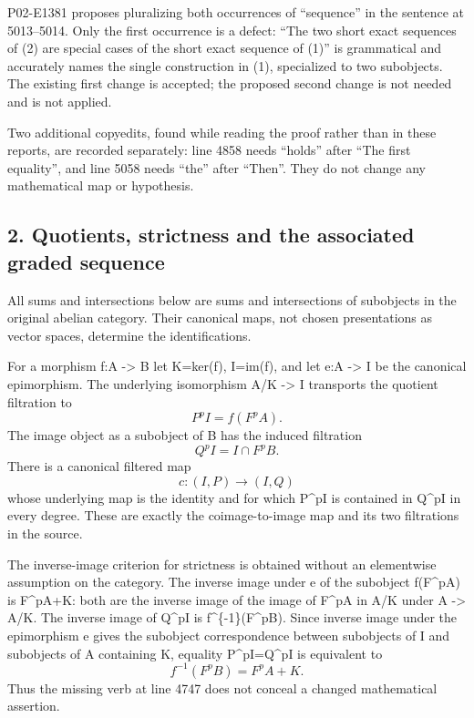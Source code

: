 P02-E1381 proposes pluralizing both occurrences of ``sequence'' in the sentence at 5013--5014. Only the first occurrence is a defect: ``The two short exact sequences of (2) are special cases of the short exact sequence of (1)'' is grammatical and accurately names the single construction in (1), specialized to two subobjects. The existing first change is accepted; the proposed second change is not needed and is not applied.

Two additional copyedits, found while reading the proof rather than in these reports, are recorded separately: line 4858 needs ``holds'' after ``The first equality'', and line 5058 needs ``the'' after ``Then''. They do not change any mathematical map or hypothesis.

\subsection{2. Quotients, strictness and the associated graded sequence}\label{note-05-quotients-strictness-and-the-associated-graded-sequence}

All sums and intersections below are sums and intersections of subobjects in the original abelian category. Their canonical maps, not chosen presentations as vector spaces, determine the identifications.

For a morphism f:A -\textgreater{} B let K=ker(f), I=im(f), and let e:A -\textgreater{} I be the canonical epimorphism. The underlying isomorphism A/K -\textgreater{} I transports the quotient filtration to \[
P^pI=f(F^pA).
\] The image object as a subobject of B has the induced filtration \[
Q^pI=I\cap F^pB.
\] There is a canonical filtered map \[
c:(I,P)\longrightarrow(I,Q)
\] whose underlying map is the identity and for which P\^{}pI is contained in Q\^{}pI in every degree. These are exactly the coimage-to-image map and its two filtrations in the source.

The inverse-image criterion for strictness is obtained without an elementwise assumption on the category. The inverse image under e of the subobject f(F\^{}pA) is F\^{}pA+K: both are the inverse image of the image of F\^{}pA in A/K under A -\textgreater{} A/K. The inverse image of Q\^{}pI is f\^{}\{-1\}(F\^{}pB). Since inverse image under the epimorphism e gives the subobject correspondence between subobjects of I and subobjects of A containing K, equality P\^{}pI=Q\^{}pI is equivalent to \[
f^{-1}(F^pB)=F^pA+K.                                      \tag{2.1}
\] Thus the missing verb at line 4747 does not conceal a changed mathematical assertion.

